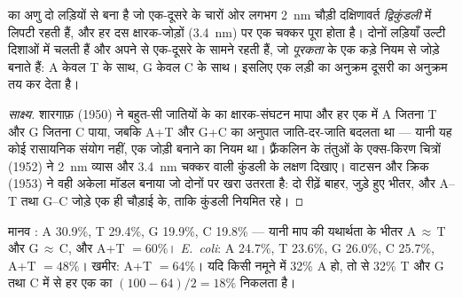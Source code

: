 \begin{proposition}[द्विकुंडली]\label{prop:g10:universal-dna:helix}
 का अणु दो लड़ियों से बना है जो एक-दूसरे के चारों ओर लगभग \qty{2}{nm}
चौड़ी दक्षिणावर्त \emph{द्विकुंडली} में लिपटी रहती
हैं, और हर दस क्षारक-जोड़ों (\qty{3.4}{nm}) पर एक चक्कर पूरा होता है।
दोनों लड़ियाँ उल्टी दिशाओं में चलती हैं और अपने  से एक-दूसरे के
सामने रहती हैं, जो \emph{पूरकता} के एक कड़े नियम से जोड़े
बनाते हैं: A केवल T के साथ, G केवल C के साथ। इसलिए एक लड़ी का अनुक्रम
दूसरी का अनुक्रम तय कर देता है।
\end{proposition}
\begin{proof}[साक्ष्य]
शारगाफ़ (1950) ने बहुत-सी जातियों के  का क्षारक-संघटन मापा और हर एक
में A जितना T और G जितना C पाया, जबकि A+T और G+C का अनुपात जाति-दर-जाति
बदलता था --- यानी यह कोई रासायनिक संयोग नहीं, एक जोड़ी बनाने का नियम था।
फ़्रैंकलिन के  तंतुओं के एक्स-किरण चित्रों (1952) ने \qty{2}{nm} व्यास
और \qty{3.4}{nm} चक्कर वाली कुंडली के लक्षण दिखाए। वाटसन और क्रिक (1953)
ने वही अकेला मॉडल बनाया जो दोनों पर खरा उतरता है: दो रीढ़ें बाहर, जुड़े
हुए  भीतर, और A--T तथा G--C जोड़े एक ही चौड़ाई के, ताकि कुंडली
नियमित रहे।
\end{proof}

\begin{example}[अंकों में शारगाफ़ का नियम]\label{ex:g10:universal-dna:chargaff}
मानव : A 30.9\%, T 29.4\%, G 19.9\%, C 19.8\% --- यानी माप की
यथार्थता के भीतर A$\,\approx\,$T और G$\,\approx\,$C, और
A+T $= 60\%$। \emph{E.~coli}: A 24.7\%, T 23.6\%, G 26.0\%, C 25.7\%,
A+T $= 48\%$। खमीर: A+T $= 64\%$। यदि किसी  नमूने में 32\% A हो, तो
 से 32\% T और G तथा C में से हर एक का $(100 - 64)/2 = 18\%$
निकलता है।
\end{example}

